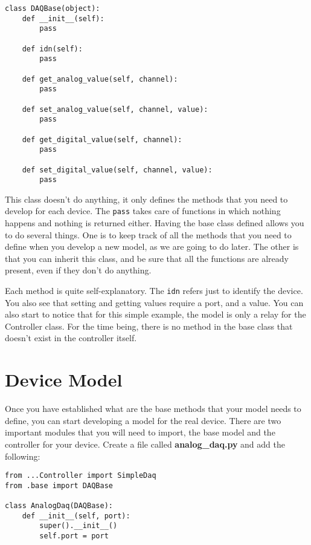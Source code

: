\begin{verbatim}
class DAQBase(object):
    def __init__(self):
        pass
    
    def idn(self):
        pass
    
    def get_analog_value(self, channel):
        pass
    
    def set_analog_value(self, channel, value):
        pass
    
    def get_digital_value(self, channel):
        pass
    
    def set_digital_value(self, channel, value):
        pass
\end{verbatim}

This class doesn't do anything, it only defines the methods that you
need to develop for each device. The \texttt{pass} takes care of
functions in which nothing happens and nothing is returned either.
Having the base class defined allows you to do several things. One is to
keep track of all the methods that you need to define when you develop a
new model, as we are going to do later. The other is that you can
inherit this class, and be sure that all the functions are already
present, even if they don't do anything.

Each method is quite self-explanatory. The \texttt{idn} refers just to
identify the device. You also see that setting and getting values
require a port, and a value. You can also start to notice that for this
simple example, the model is only a relay for the Controller class. For
the time being, there is no method in the base class that doesn't exist
in the controller itself.

\section{Device Model}\label{devicemodel}
Once you have established what are the base methods that your model
needs to define, you can start developing a model for the real device.
There are two important modules that you will need to import, the base
model and the controller for your device. Create a file called
\textbf{analog\_daq.py} and add the following:

\begin{verbatim}
from ...Controller import SimpleDaq
from .base import DAQBase

class AnalogDaq(DAQBase):
    def __init__(self, port):
        super().__init__()
        self.port = port
\end{verbatim}

